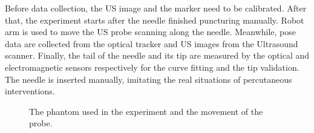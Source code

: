 \documentclass[journal,article,submit,moreauthors,pdftex]{Definitions/mdpi}
\begin{document}
Before data collection, the US image and the marker need to be calibrated. After that, the experiment starts after the needle finished puncturing manually. Robot arm is used to move the US probe scanning along the needle. Meanwhile, pose data are collected from the optical tracker and US images from the Ultrasound scanner. Finally, the tail of the needle and its tip are measured by the optical and electromagnetic sensors respectively for the curve fitting and the tip validation. The needle is inserted manually, imitating the real situations of percutaneous interventions.

\begin{figure}[H]
\setlength{\subfigcapskip}{-1bp}
\centering
\begin{minipage}{\textwidth}
\centering
\subfigure{\label{fig:002a}}\addtocounter{subfigure}{-1}
\hspace{2em}
\subfigure{\label{fig:002b}}\addtocounter{subfigure}{-1}
\end{minipage}
\vspace{0.1em}
\caption[The phantom used in the experiment and the movement of the probe.]{The phantom used in the experiment and the movement of the probe.}\label{fig:002}
\end{figure}
\end{document}
